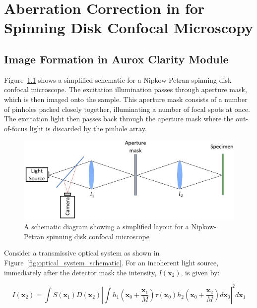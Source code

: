 \chapter{Aberration Correction in for Spinning Disk Confocal Microscopy}
\label{chpt:Aurox}

\section{Image Formation in Aurox Clarity Module}
\label{sec:Aurox_image_formation}

Figure~\ref{fig:confocal_schematic} shows a simplified schematic 
for a Nipkow-Petran spinning disk confocal microscope. The 
excitation illumination passes through aperture mask, which is 
then imaged onto the sample. This aperture mask consists of a 
number of pinholes packed closely together, illuminating a number 
of focal spots at once. The excitation light then passes back 
through the aperture mask where the out-of-focus light is 
discarded by the pinhole array.\cite{egger1967new,fuseler2018types}

\begin{figure}[h]
	\centering
	\includegraphics[width=\textwidth]{images/confocal_schematic.jpg}
	\caption[Simplified Nipkow-Petran confocal layout]{A schematic diagram showing a simplified layout for a Nipkow-Petran spinning disk confocal microscope}
	\label{fig:confocal_schematic}
\end{figure}

Consider a transmissive optical system as shown in 
Figure~\ref{fig:optical_system_schematic}. For an incoherent 
light source, immediately after the detector mask the 
intensity, $I\left(\textbf{x}_{2}\right)$, is given by:

\begin{equation}\label{eq:intensity_after_detector}
I\left(\textbf{x}_{2}\right) = \int S\left(\textbf{x}_{1}\right) D\left(\textbf{x}_{2}\right) \left| \int h_{1}\left(\textbf{x}_{0} + \frac{\textbf{x}_{1}}{M}\right) \tau\left(\textbf{x}_{0}\right) h_{2}\left(\textbf{x}_{0} + \frac{\textbf{x}_{2}}{M}\right)d\textbf{x}_{0}\right|^{2}d\textbf{x}_{1}
\end{equation}

